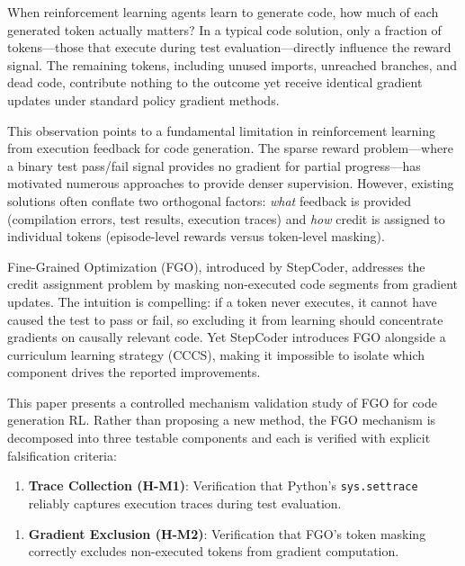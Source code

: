 
When reinforcement learning agents learn to generate code, how much of each generated token actually matters? In a typical code solution, only a fraction of tokens---those that execute during test evaluation---directly influence the reward signal. The remaining tokens, including unused imports, unreached branches, and dead code, contribute nothing to the outcome yet receive identical gradient updates under standard policy gradient methods.

This observation points to a fundamental limitation in reinforcement learning from execution feedback for code generation. The sparse reward problem---where a binary test pass/fail signal provides no gradient for partial progress---has motivated numerous approaches to provide denser supervision. However, existing solutions often conflate two orthogonal factors: \textit{what} feedback is provided (compilation errors, test results, execution traces) and \textit{how} credit is assigned to individual tokens (episode-level rewards versus token-level masking).

Fine-Grained Optimization (FGO), introduced by StepCoder, addresses the credit assignment problem by masking non-executed code segments from gradient updates. The intuition is compelling: if a token never executes, it cannot have caused the test to pass or fail, so excluding it from learning should concentrate gradients on causally relevant code. Yet StepCoder introduces FGO alongside a curriculum learning strategy (CCCS), making it impossible to isolate which component drives the reported improvements.

This paper presents a controlled mechanism validation study of FGO for code generation RL. Rather than proposing a new method, the FGO mechanism is decomposed into three testable components and each is verified with explicit falsification criteria:

\begin{enumerate}
\item \textbf{Trace Collection (H-M1)}: Verification that Python's \texttt{sys.settrace} reliably captures execution traces during test evaluation.
\end{enumerate}

\begin{enumerate}
\item \textbf{Gradient Exclusion (H-M2)}: Verification that FGO's token masking correctly excludes non-executed tokens from gradient computation.
\end{enumerate}

